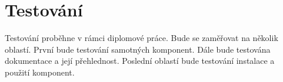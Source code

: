 
\chapter{Testování}

Testování proběhne v rámci diplomové práce. Bude se zaměřovat na několik oblastí. První bude testování samotných komponent. Dále
bude testována dokumentace a její přehlednost. Poslední oblastí bude testování instalace a použití komponent.
